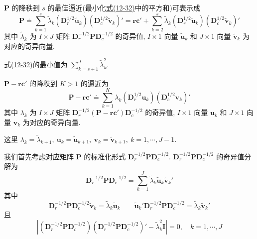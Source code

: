 
$\mathbf{P}$ 的降秩到 $s$ 的最佳逼近(最小化\hyperref[eq:12-32]{式(12-32)}中的平方和)可表示成
\[
\mathbf{P}\doteq\sum_{k=1}^{s}\tilde{\lambda}_k(\mathbf{D}_r^{1/2}\tilde{\mathbf{u}}_k)(\mathbf{D}_c^{1/2}\tilde{\mathbf{v}}_k)'
=\mathbf{r}\mathbf{c}'+\sum_{k=2}^{s}\tilde{\lambda}_k(\mathbf{D}_r^{1/2}\tilde{\mathbf{u}}_k)(\mathbf{D}_c^{1/2}\tilde{\mathbf{v}}_k)'
\]
其中 $\tilde{\lambda}_k$ 为 $I\times J$ 矩阵 $\mathbf{D}_r^{-1/2}\mathbf{P}\mathbf{D}_c^{-1/2}$ 的奇异值, $I\times 1$ 向量 $\tilde{\mathbf{u}}_k$ 和 $J\times 1$ 向量 $\tilde{\mathbf{v}}_k$ 为对应的奇异向量.

\hyperref[eq:12-32]{式(12-32)}的最小值为 $\sum_{k=s+1}^{J}\tilde{\lambda}_k^2$.

$\mathbf{P}-\mathbf{r}\mathbf{c}'$ 的降秩到 $K>1$ 的逼近为
\label{eq:12-33}
\begin{equation}
\mathbf{P}-\mathbf{r}\mathbf{c}'\doteq\sum_{k=1}^{K}\lambda_k(\mathbf{D}_r^{1/2}\mathbf{u}_k)(\mathbf{D}_c^{1/2}\mathbf{v}_k)'
\tag{12-33}
\end{equation}
其中 $\lambda_k$ 为 $I\times J$ 矩阵 $\mathbf{D}_r^{-1/2}(\mathbf{P}-\mathbf{r}\mathbf{c}')\mathbf{D}_c^{-1/2}$ 的奇异值, $I\times 1$ 向量 $\mathbf{u}_k$ 和 $J\times 1$ 向量 $\mathbf{v}_k$ 为对应的奇异向量.

这里 $\lambda_k=\tilde{\lambda}_{k+1},\ \mathbf{u}_k=\tilde{\mathbf{u}}_{k+1},\ \mathbf{v}_k=\tilde{\mathbf{v}}_{k+1},\ k=1,\cdots,J-1$.

\quad 我们首先考虑对应矩阵 $\mathbf{P}$ 的标准化形式 $\mathbf{D}_r^{-1/2}\mathbf{P}\mathbf{D}_c^{-1/2}$. $\mathbf{D}_r^{-1/2}\mathbf{P}\mathbf{D}_c^{-1/2}$ 的奇异值分解为
\label{eq:12-34}
\begin{equation}
\mathbf{D}_r^{-1/2}\mathbf{P}\mathbf{D}_c^{-1/2}=\sum_{k=1}^{J}\tilde{\lambda}_k\tilde{\mathbf{u}}_k\tilde{\mathbf{v}}_k'
\tag{12-34}
\end{equation}
其中
\label{eq:12-35}
\begin{equation}
\mathbf{D}_r^{-1/2}\mathbf{P}\mathbf{D}_c^{-1/2}\tilde{\mathbf{v}}_k=\tilde{\lambda}_k\tilde{\mathbf{u}}_k\qquad
\tilde{\mathbf{u}}_k'\mathbf{D}_r^{-1/2}\mathbf{P}\mathbf{D}_c^{-1/2}=\tilde{\lambda}_k\tilde{\mathbf{v}}_k'
\tag{12-35}
\end{equation}
且
\[
\left|(\mathbf{D}_r^{-1/2}\mathbf{P}\mathbf{D}_c^{-1/2})(\mathbf{D}_r^{-1/2}\mathbf{P}\mathbf{D}_c^{-1/2})'
-\tilde{\lambda}_k^2\mathbf{I}\right|=0,\quad k=1,\cdots,J
\]
